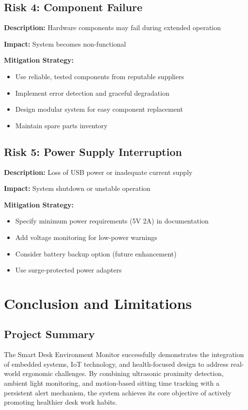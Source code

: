 \documentclass[12pt,a4paper]{article}
\begin{document}
\subsection{Risk 4: Component Failure}

\textbf{Description:} Hardware components may fail during extended operation

\textbf{Impact:} System becomes non-functional

\textbf{Mitigation Strategy:}
\begin{itemize}
\item Use reliable, tested components from reputable suppliers
\item Implement error detection and graceful degradation
\item Design modular system for easy component replacement
\item Maintain spare parts inventory
\end{itemize}

\subsection{Risk 5: Power Supply Interruption}

\textbf{Description:} Loss of USB power or inadequate current supply

\textbf{Impact:} System shutdown or unstable operation

\textbf{Mitigation Strategy:}
\begin{itemize}
\item Specify minimum power requirements (5V 2A) in documentation
\item Add voltage monitoring for low-power warnings
\item Consider battery backup option (future enhancement)
\item Use surge-protected power adapters
\end{itemize}

\newpage
\section{Conclusion and Limitations}

\subsection{Project Summary}

The Smart Desk Environment Monitor successfully demonstrates the integration of embedded systems, IoT technology, and health-focused design to address real-world ergonomic challenges. By combining ultrasonic proximity detection, ambient light monitoring, and motion-based sitting time tracking with a persistent alert mechanism, the system achieves its core objective of actively promoting healthier desk work habits.
\end{document}

